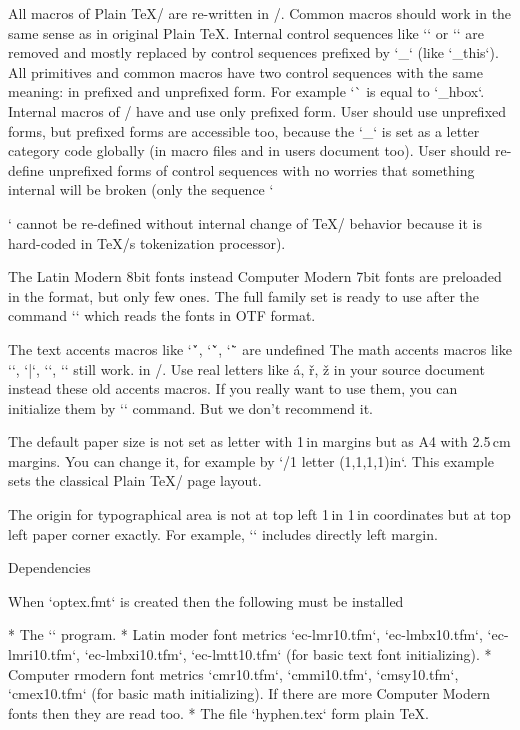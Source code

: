 {All macros of Plain \TeX/ are re-written in \OpTeX/. Common macros should
work in the same sense as in original Plain \TeX. Internal control sequences
\new 
like `\p@` or `\f@@t` are removed and mostly replaced by control sequences
prefixed by `_` (like `\_this`). All primitives and common macros have two
control sequences with the same meaning: in prefixed and unprefixed form.
For example `\hbox` is equal to `\_hbox`. 
Internal macros of \OpTeX/ have and use only prefixed form. User should use
unprefixed forms, but prefixed forms are accessible too, because the `_` is
set as a letter category code globally (in macro files and in users document too). User
should re-define unprefixed forms of control sequences with no worries that
something internal will be broken (only the sequence `\par` cannot be
re-defined without internal change of \TeX/ behavior because it is
hard-coded in \TeX/s tokenization processor).

\new
The Latin Modern 8bit fonts instead Computer Modern 7bit fonts are
preloaded in the format, but only few ones. The full family set is ready to
use after the command `\fontfam[LMfonts]` which reads the fonts in OTF
format.

\new
The text accents macros like `\'`, `\v`, `\"` are undefined\fnote 
{The math accents macros like `\acute`, `\bar`, `\dot`, `\hat` still work.}
in \OpTeX/. Use real
letters like á, ř, ž in your source document instead these old accents macros.
If you really want to use them, you can initialize them by `\oldaccents`
command. But we don't recommend it.

\new
The default paper size is not set as letter with 1\,in margins but as A4 with
2.5\,cm margins. You can change it, for example by 
`\margins/1 letter (1,1,1,1)in`. This example sets the classical Plain \TeX/
page layout.

\new
The origin for typographical area is not at top left 1\,in 1\,in coordinates
but at top left paper corner exactly. For example, `\hoffset` includes directly left
margin.


\bye



\sec Dependencies

When `optex.fmt` is created then the following must be installed

\begitems
* The `\luatex` program.
* Latin moder font metrics 
  `ec-lmr10.tfm`, `ec-lmbx10.tfm`, `ec-lmri10.tfm`,
  `ec-lmbxi10.tfm`, `ec-lmtt10.tfm` (for basic text font initializing).
* Computer rmodern font metrics
  `cmr10.tfm`, `cmmi10.tfm`, `cmsy10.tfm`, `cmex10.tfm` (for basic math
  initializing). If there are more Computer Modern fonts then they are read
  too.
* The file `hyphen.tex` form plain \TeX.
\enditems

}
